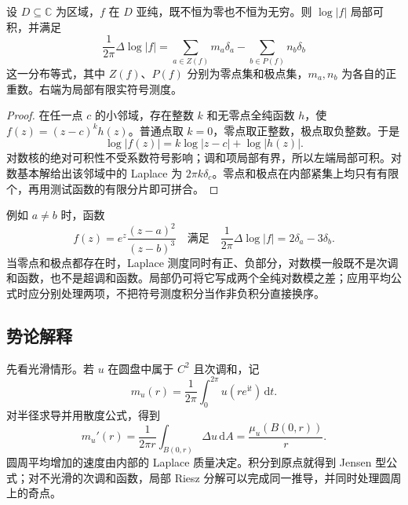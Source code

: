 \begin{proposition}[亚纯对数模的零极点测度]\label{b3:prop:18-meromorphic-riesz}
设 \(D\subseteq\mathbb C\) 为区域，\(f\) 在 \(D\) 亚纯，既不恒为零也不恒为无穷。则 \(\log|f|\) 局部可积，并满足
\[
 \frac1{2\pi}\Delta\log|f|
 =\sum_{a\in Z(f)}m_a\delta_a-\sum_{b\in P(f)}n_b\delta_b
\]
这一分布等式，其中 \(Z(f)\)、\(P(f)\) 分别为零点集和极点集，\(m_a,n_b\) 为各自的正重数。右端为局部有限实符号测度。
\end{proposition}
\begin{proof}
在任一点 \(c\) 的小邻域，存在整数 \(k\) 和无零点全纯函数 \(h\)，使 \(f(z)=(z-c)^k h(z)\)。普通点取 \(k=0\)，零点取正整数，极点取负整数。于是
\[
 \log|f(z)|=k\log|z-c|+\log|h(z)|.
\]
对数核的绝对可积性不受系数符号影响；调和项局部有界，所以左端局部可积。对数基本解给出该邻域中的 Laplace 为 \(2\pi k\delta_c\)。零点和极点在内部紧集上均只有有限个，再用测试函数的有限分片即可拼合。
\end{proof}

例如 \(a\ne b\) 时，函数
\[
 f(z)=e^z\frac{(z-a)^2}{(z-b)^3}
 \quad\text{满足}\quad
 \frac1{2\pi}\Delta\log|f|=2\delta_a-3\delta_b.
\]
当零点和极点都存在时，Laplace 测度同时有正、负部分，对数模一般既不是次调和函数，也不是超调和函数。局部仍可将它写成两个全纯对数模之差；应用平均公式时应分别处理两项，不把符号测度积分当作非负积分直接换序。

\subsection{势论解释}
\label{b3:subsec:180303}

先看光滑情形。若 \(u\) 在圆盘中属于 \(C^2\) 且次调和，记
\[
 m_u(r)=\frac1{2\pi}\int_0^{2\pi}u(re^{\mathrm it})\,\mathrm dt.
\]
对半径求导并用散度公式，得到
\[
 m_u'(r)=\frac1{2\pi r}\int_{B(0,r)}\Delta u\,\mathrm dA
 =\frac{\mu_u(B(0,r))}{r}.
\]
圆周平均增加的速度由内部的 Laplace 质量决定。积分到原点就得到 Jensen 型公式；对不光滑的次调和函数，局部 Riesz 分解可以完成同一推导，并同时处理圆周上的奇点。

